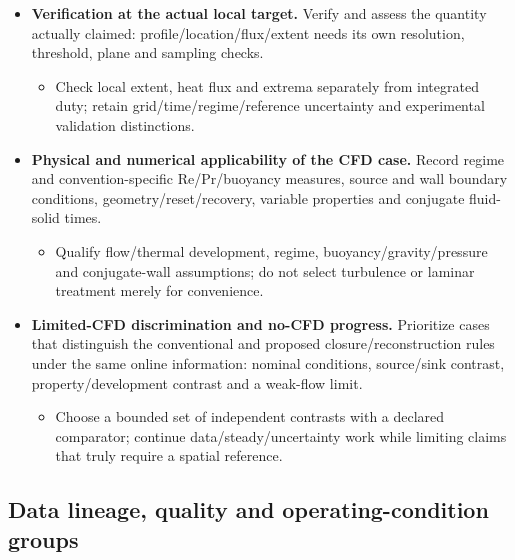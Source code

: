 \begin{itemize}[leftmargin=*]
\begin{itemize}
\end{itemize}
\item {}\textbf{Verification at the actual local target.} Verify and assess the quantity actually claimed: profile/\allowbreak{}location/\allowbreak{}flux/\allowbreak{}extent needs its own resolution, threshold, plane and sampling checks.
\begin{itemize}
\item Check local extent, heat flux and extrema separately from integrated duty; retain grid/\allowbreak{}time/\allowbreak{}regime/\allowbreak{}reference uncertainty and experimental validation distinctions.
\end{itemize}
\item {}\textbf{Physical and numerical applicability of the CFD case.} Record regime and convention-specific Re/\allowbreak{}Pr/\allowbreak{}buoyancy measures, source and wall boundary conditions, geometry/\allowbreak{}reset/\allowbreak{}recovery, variable properties and conjugate fluid-solid times.
\begin{itemize}
\item Qualify flow/\allowbreak{}thermal development, regime, buoyancy/\allowbreak{}gravity/\allowbreak{}pressure and conjugate-wall assumptions; do not select turbulence or laminar treatment merely for convenience.
\end{itemize}
\item {}\textbf{Limited-CFD discrimination and no-CFD progress.} Prioritize cases that distinguish the conventional and proposed closure/\allowbreak{}reconstruction rules under the same online information: nominal conditions, source/\allowbreak{}sink contrast, property/\allowbreak{}development contrast and a weak-flow limit.
\begin{itemize}
\item Choose a bounded set of independent contrasts with a declared comparator; continue data/\allowbreak{}steady/\allowbreak{}uncertainty work while limiting claims that truly require a spatial reference.
\end{itemize}
\end{itemize}

\subsection{Data lineage, quality and operating-condition groups}\label{subsec:data-lineage-quality-and-operating-condition-groups}

